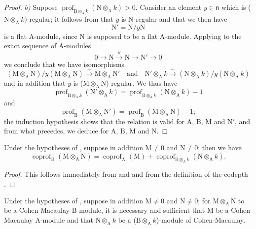 \begin{proof}
\emph{b)} Suppose $\operatorname{prof}_{\mathrm{B}\otimes_\mathrm{A} k}(\mathrm{N}\otimes_\mathrm{A} k)>0$.
Consider an element $y\in\mathfrak{n}$ which is ($\mathrm{N}\otimes_\mathrm{A} k$)-regular; it follows from  that $y$ is N-regular and that we then have
\[
  \mathrm{N}'=\mathrm{N}/y\mathrm{N}
\]
is a flat $\mathrm{A}$-module, since $\mathrm{N}$ is supposed to be a flat $\mathrm{A}$-module.
Applying  to the exact sequence of $\mathrm{A}$-modules
\[
  0\to\mathrm{N}\xrightarrow{y}\mathrm{N}\to\mathrm{N}'\to 0
\]
we conclude that we have isomorphisms
\[
  (\mathrm{M}\otimes_\mathrm{A}\mathrm{N})/y(\mathrm{M}\otimes_\mathrm{A}\mathrm{N})\xrightarrow{\sim}\mathrm{M}\otimes_\mathrm{A}\mathrm{N}' \quad\text{and}\quad \mathrm{N}'\otimes_\mathrm{A} k\xrightarrow{\sim}(\mathrm{N}\otimes_\mathrm{A} k)/y(\mathrm{N}\otimes_\mathrm{A} k)
\]
and in addition that $y$ is ($\mathrm{M}\otimes_\mathrm{A}\mathrm{N}$)-regular.
We thus have
\[
  \operatorname{prof}_{\mathrm{B}\otimes_\mathrm{A} k}(\mathrm{N}'\otimes_\mathrm{A} k)=\operatorname{prof}_{\mathrm{B}\otimes_\mathrm{A} k}(\mathrm{N}\otimes_\mathrm{A} k)-1
\]
and
\[
  \operatorname{prof}_\mathrm{B}(\mathrm{M}\otimes_\mathrm{A}\mathrm{N}')=\operatorname{prof}_\mathrm{B}(\mathrm{M}\otimes_\mathrm{A}\mathrm{N})-1;
\]
the induction hypothesis shows that the relation  is valid for $\mathrm{A}$, $\mathrm{B}$, $\mathrm{M}$ and $\mathrm{N}'$, and from what precedes, we deduce  for $\mathrm{A}$, $\mathrm{B}$, $\mathrm{M}$ and $\mathrm{N}$.
\end{proof}

\begin{corollary}[6.3.2]
\label{IV.6.3.2}
Under the hypotheses of , suppose in addition $\mathrm{M}\neq 0$ and $\mathrm{N}\neq 0$; then we have
\begin{equation}
  \operatorname{coprof}_\mathrm{B}(\mathrm{M}\otimes_\mathrm{A}\mathrm{N})=\operatorname{coprof}_\mathrm{A}(\mathrm{M})+\operatorname{coprof}_{\mathrm{B}\otimes_\mathrm{A} k}(\mathrm{N}\otimes_\mathrm{A} k).
  \label{IV.6.3.2.1}
\tag{6.3.2.1}
\end{equation}
\end{corollary}

\begin{proof}
This follows immediately from  and  and from the definition of the codepth .
\end{proof}

\begin{corollary}[6.3.3]
\label{IV.6.3.3}
Under the hypotheses of , suppose in addition $\mathrm{M}\neq 0$ and $\mathrm{N}\neq 0$; for $\mathrm{M}\otimes_\mathrm{A}\mathrm{N}$ to be a Cohen-Macaulay $\mathrm{B}$-module, it is necessary and sufficient that $\mathrm{M}$ be a Cohen-Macaulay $\mathrm{A}$-module and that $\mathrm{N}\otimes_\mathrm{A} k$ be a ($\mathrm{B}\otimes_\mathrm{A} k$)-module of Cohen-Macaulay.
\end{corollary}

